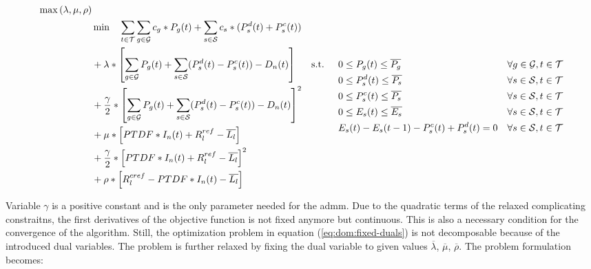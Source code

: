 \begin{subequations}
	\begin{align}
		\max{(\lambda, \mu, \rho)} \label{eq:dom:fixed-duals} \\
		 & \min \quad \sum_{t\in\mathcal{T}}\sum_{g\in\mathcal{G}}c_g*P_g(t) + \sum_{s\in\mathcal{S}}c_s*(P_s^d(t)+P_s^c(t)) \nonumber \\
		 & + \lambda * \left[\sum_{g\in\mathcal{G}}P_g(t) + \sum_{s\in\mathcal{S}}(P_s^d(t)-P_s^c(t))-D_n(t)\right]\nonumber \\
		 & + \frac{\gamma}{2} * \left[\sum_{g\in\mathcal{G}}P_g(t) + \sum_{s\in\mathcal{S}}(P_s^d(t)-P_s^c(t))-D_n(t)\right]^2 \nonumber \\
		 & + \mu * \left[PTDF * I_n(t) + R^{ref}_l - \overline{L_l}\right] \nonumber \\
		 & + \frac{\gamma}{2} * \left[PTDF * I_n(t) + R^{ref}_l - \overline{L_l}\right]^2 \nonumber \\
		 & + \rho * \left[R^{cref}_l - PTDF * I_n(t) - \overline{L_l}\right]\nonumber
	\end{align}
	\begin{align}
		 \text{s.t. } \quad & 0 \leq P_g(t) \leq \overline{P_g} && \forall g \in \set{G}, t \in \set{T}\\\
		 & 0 \leq P_s^d(t) \leq \overline{P_s} && \forall s \in \set{S}, t \in \set{T}\\
		 & 0 \leq P_s^c(t) \leq \overline{P_s} && \forall s \in \set{S}, t \in \set{T}\\
		 & 0 \leq E_s(t) \leq \overline{E_s} && \forall s \in \set{S}, t \in \set{T}\\
		 & E_s(t) - E_s(t-1) - P_s^c(t) + P_s^d(t) = 0 && \forall s \in \set{S}, t \in \set{T}
	\end{align}
\end{subequations}

Variable $\gamma$ is a positive constant and is the only parameter needed for the \gls{admm}. Due to the quadratic terms of the relaxed complicating constraitns, the first derivatives of the objective function is not fixed anymore but continuous. This is also a necessary condition for the convergence of the algorithm. Still, the optimization problem in equation (\ref{eq:dom:fixed-duals}) is not decomposable because of the introduced dual variables. The problem is further relaxed by fixing the dual variable to given values $\overline{\lambda}$, $\overline{\mu}$, $\overline{\rho}$. The problem formulation becomes:

